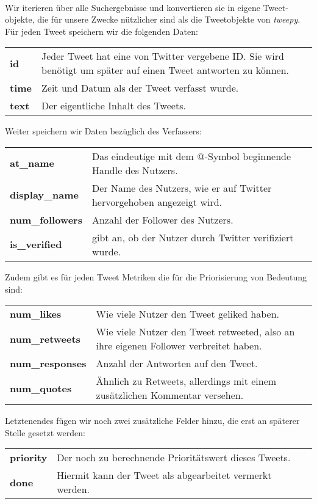 \documentclass[runningheads]{llncs}
\begin{document}
\paragraph{} Wir iterieren über alle Suchergebnisse und konvertieren sie in eigene Tweet-objekte, die für unsere Zwecke nützlicher sind als die Tweetobjekte von \textit{tweepy}.
Für jeden Tweet speichern wir die folgenden Daten: \\
\begin{tabular}{p{} p{}}
    \bf id & Jeder Tweet hat eine von Twitter vergebene ID. Sie wird benötigt um später auf einen Tweet antworten zu können. \\
    \bf time & Zeit und Datum als der Tweet verfasst wurde. \\
    \bf text & Der eigentliche Inhalt des Tweets.
\end{tabular}
\newline
\newline
Weiter speichern wir Daten bezüglich des Verfassers: \\
\begin{tabular}{p{} p{}}
    \bf at\_name & Das eindeutige mit dem @-Symbol beginnende Handle des Nutzers. \\
    \bf display\_name & Der Name des Nutzers, wie er auf Twitter hervorgehoben angezeigt wird. \\
    \bf num\_followers & Anzahl der Follower des Nutzers. \\
    \bf is\_verified & gibt an, ob der Nutzer durch Twitter verifiziert wurde.
\end{tabular}
\newline
\newline
Zudem gibt es für jeden Tweet Metriken die für die Priorisierung von Bedeutung sind: \\
\begin{tabular}{p{} p{}}
    \bf num\_likes & Wie viele Nutzer den Tweet geliked haben. \\
    \bf num\_retweets & Wie viele Nutzer den Tweet retweeted, also an ihre eigenen Follower verbreitet haben. \\
    \bf num\_responses & Anzahl der Antworten auf den Tweet. \\
    \bf num\_quotes & Ähnlich zu Retweets, allerdings mit einem zusätzlichen Kommentar versehen.
\end{tabular}
\newline
\newline
Letztenendes fügen wir noch zwei zusätzliche Felder hinzu, die erst an späterer Stelle gesetzt werden: \\
\begin{tabular}{p{} p{}}
    \bf priority & Der noch zu berechnende Prioritätswert dieses Tweets. \\
    \bf done & Hiermit kann der Tweet als abgearbeitet vermerkt werden.
\end{tabular}
\newline
\newline
\end{document}
